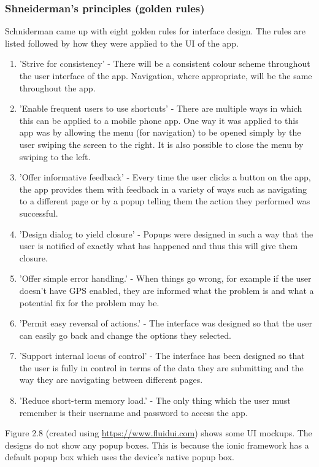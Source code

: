 \subsubsection{Shneiderman's principles (golden rules)}
Schniderman came up with eight golden rules for interface design. The rules are listed followed by how they were applied to the UI of the app. \cite{sch}
\begin{enumerate}
	\item 'Strive for consistency' - There will be a consistent colour scheme throughout the user interface of the app. Navigation, where appropriate, will be the same throughout the app.
	\item 'Enable frequent users to use shortcuts' - There are multiple ways in which this can be applied to a mobile phone app. One way it was applied to this app was by allowing the menu (for navigation) to be opened simply by the user swiping the screen to the right. It is also possible to close the menu by swiping to the left.
	\item 'Offer informative feedback' - Every time the user clicks a button on the app, the app provides them with feedback in a variety of ways such as navigating to a different page or by a popup telling them the action they performed was successful.
	\item 'Design dialog to yield closure' - Popups were designed in such a way that the user is notified of exactly what has happened and thus this will give them closure.
	\item 'Offer simple error handling.' - When things go wrong, for example if the user doesn't have GPS enabled, they are informed what the problem is and what a potential fix for the problem may be.
	\item 'Permit easy reversal of actions.' - The interface was designed so that the user can easily go back and change the options they selected.
	\item 'Support internal locus of control' - The interface has been designed so that the user is fully in control in terms of the data they are submitting and the way they are navigating between different pages.
	\item 'Reduce short-term memory load.' - The only thing which the user must remember is their username and password to access the app.
\end{enumerate}
Figure 2.8 (created using \url {https://www.fluidui.com}) shows some UI mockups. The designs do not show any popup boxes. This is because the ionic framework has a default popup box which uses the device's native popup box.
